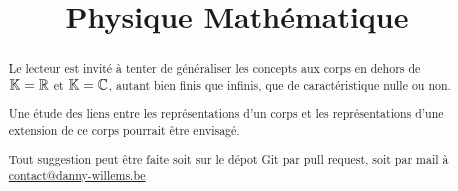 \documentclass[a4paper, 12pt]{report}
\title{Physique Mathématique}
\author{}
\begin{document}
\maketitle

\begin{abstract}
	Le lecteur est invité à tenter de généraliser les concepts aux corps en
	dehors de $\mathbb{K} = \mathbb{R}$ et $\mathbb{K} = \mathbb{C}$, autant bien
	finis que infinis, que de caractéristique nulle ou non.

	Une étude des liens entre les représentations d'un corps et les
	représentations d'une extension de ce corps pourrait être envisagé.

	Tout suggestion peut être faite soit sur le dépot Git par pull request, soit
	par mail à
	\href{mailto:contact@danny-willems.be}{contact@danny-willems.be}
\end{abstract}

\tableofcontents



\end{document}
